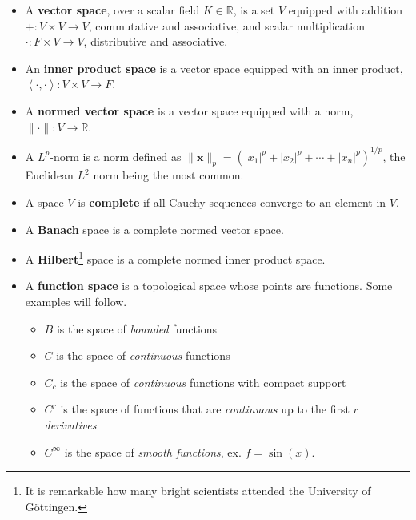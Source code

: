 \documentclass{digitaldynamics}
\def\vect#1{\bm{#1}}
\begin{document}
\begin{itemize}
	\item A \textbf{vector space}, over a scalar field $K \in \mathbb{R}$, is a set $V$ equipped with 
	addition $+: V \times V \rightarrow V$, commutative and associative, 
	and scalar multiplication $\cdot: F \times V \rightarrow V$, distributive and associative.
	
	\item An \textbf{inner product space} is a vector space equipped with an inner product, $\left\langle\cdot,\cdot\right\rangle : V \times V \rightarrow F$.
	
	\item A \textbf{normed vector space} is a vector space equipped with a norm, $\| \cdot \| : V \rightarrow \mathbb{R}$.
	
	\item A $L^p$-norm is a norm defined as $\| \vect{x} \|_p = \left( |x_1|^p + |x_2|^p + \dotsb + |x_n|^p \right) ^{1/p}$, the Euclidean $L^2$ norm being the most common.
	
	\item A space $V$ is \textbf{complete} if all Cauchy sequences converge to an element in $V$.
	
	\item A \textbf{Banach} space is a complete normed vector space.
	
	\item A \textbf{Hilbert}\footnote{It is remarkable how many bright scientists attended the University of Göttingen.} space is a complete normed inner product space.
	
	\item A \textbf{function space} is a topological space whose points are functions. Some examples will follow.
	
	
	
	\begin{itemize}
		\item $B$ is the space of \textit{bounded} functions
		
		\item $C$ is the space of \textit{continuous} functions
		
		\item $C_c$ is the space of \textit{continuous} functions with compact support
		
		\item $C^r$ is the space of functions that are \textit{continuous} up to the first $r$ \textit{derivatives}
		
		\item $C^\infty$ is the space of \textit{smooth functions}, ex. $f=\sin(x)$.
		

\end{itemize}
\end{itemize}
\end{document}
